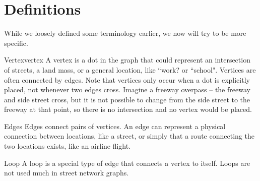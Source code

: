 \section{Definitions}
While we loosely defined some terminology earlier, we now will try to be more specific.

\begin{definition}{Vertex}{vertex} 
A vertex is a dot in the graph that could represent an intersection of streets, a land mass, or a general location, like ``work? or ``school".  Vertices are often connected by edges.  Note that vertices only occur when a dot is explicitly placed, not whenever two edges cross.  Imagine a freeway overpass -- the freeway and side street cross, but it is not possible to change from the side street to the freeway at that point, so there is no intersection and no vertex would be placed.
\end{definition}

\begin{definition}{Edges}{}
Edges connect pairs of vertices.  An edge can represent a physical connection between locations, like a street, or simply that a route connecting the two locations exists, like an airline flight.
\end{definition}

\begin{definition}{Loop}{}
A loop is a special type of edge that connects a vertex to itself.  Loops are not used much in street network graphs.\\

 \end{definition}


